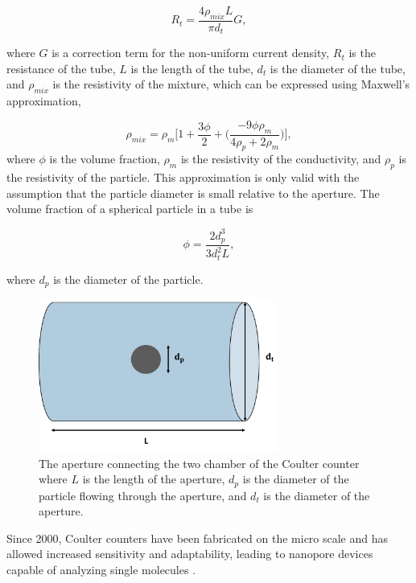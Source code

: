 \begin{equation}
    R_t = \frac{4\rho_{mix}L}{\pi d_{t}} G,
    \label{eqn:tube_resistance}
\end{equation}

\noindent where $G$ is a correction term for the non-uniform current density, $R_t$ is the resistance of the tube, $L$ is the length of the tube, $d_{t}$ is the diameter of the tube, and $\rho_{mix}$ is the resistivity of the mixture, which can be expressed using Maxwell's approximation, 

\begin{equation}
    \rho_{mix} = \rho_m\bigg[ 1 + \frac{3\phi}{2} + \Big(\frac{-9\phi \rho_m}{4 \rho_p + 2 \rho_m}\Big)\bigg],
\end{equation}
\noindent where $\phi$ is the volume fraction, $\rho_m$ is the resistivity of the conductivity, and $\rho_p$ is the resistivity of the particle. This approximation is only valid with the assumption that the particle diameter is small relative to the aperture. The volume fraction of a spherical particle in a tube is

\begin{equation}
    \phi = \frac{2d_p^3}{3d^2_tL},
\end{equation}

\noindent where $d_p$ is the diameter of the particle.

\begin{figure}[ht]
    \centering
    \includegraphics[width=0.7\textwidth]{images/aperture.png}
    \caption[The aperture connecting the two chamber of the Coulter counter.]{The aperture connecting the two chamber of the Coulter counter where $L$ is the length of the aperture, $d_p$ is the diameter of the particle flowing through the aperture, and $d_{t}$ is the diameter of the aperture.}
    \label{fig:aperture}
\end{figure}
 
\par Since 2000, Coulter counters have been fabricated on the micro scale and has allowed increased sensitivity and adaptability, leading to nanopore devices capable of analyzing single molecules \cite{sun_single-cell_2010}.
 
